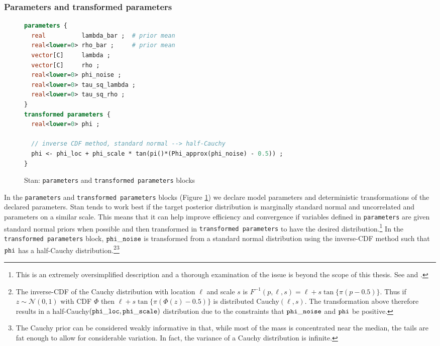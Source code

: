 \subsubsection{Parameters and transformed parameters}

\begin{figure}[h]
\begin{lstlisting}[language=Stan, frame=trBL]
parameters {
  real          lambda_bar ;  # prior mean 
  real<lower=0> rho_bar ;     # prior mean 
  vector[C]     lambda ;      
  vector[C]     rho ;
  real<lower=0> phi_noise ;    
  real<lower=0> tau_sq_lambda ;  
  real<lower=0> tau_sq_rho ;
}
transformed parameters {
  real<lower=0> phi ;
  
  // inverse CDF method, standard normal --> half-Cauchy
  phi <- phi_loc + phi_scale * tan(pi()*(Phi_approx(phi_noise) - 0.5)) ;
}
\end{lstlisting}
\caption{Stan: {\tt parameters} and {\tt transformed parameters} blocks}
\label{stan_parameters}
\end{figure}

In the {\tt parameters} and {\tt transformed parameters} blocks (Figure \ref{stan_parameters}) we declare model parameters and deterministic transformations of the declared parameters. Stan tends to work best if the target posterior distribution is marginally standard normal and uncorrelated and parameters on a  similar scale. This means that it can help improve efficiency and convergence if variables defined in {\tt parameters} are given standard normal priors when possible and then transformed in {\tt transformed parameters} to have the desired distribution.\footnote{This is an extremely oversimplified description and a thorough examination of the issue is beyond the scope of this thesis. See  and .} In the {\tt transformed parameters} block, ${\tt phi\_noise}$ is transformed from a standard normal distribution using the inverse-CDF method such that ${\tt phi}$ has a half-Cauchy distribution.\footnote{The inverse-CDF of the Cauchy distribution with location $\ell$ and scale $s$ is $F^{-1}(p, \ell,s)  = \ell + s \tan{\{ \pi (p - 0.5)\}}$. Thus if $z \sim \mathcal{N}(0,1)$ with CDF $\Phi$ then $\ell + s \tan{\{ \pi (\Phi(z) - 0.5)\}}$ is distributed Cauchy$(\ell, s)$. The transformation above therefore results in a half-Cauchy$({\tt phi\_loc}, {\tt phi\_scale})$ distribution due to the constraints that ${\tt phi\_noise}$ and ${\tt phi}$ be positive.}\footnote{The Cauchy prior can be considered weakly informative in that, while most of the mass is concentrated near the median, the tails are fat enough to allow for considerable variation. In fact, the variance of a Cauchy distribution is infinite.}





